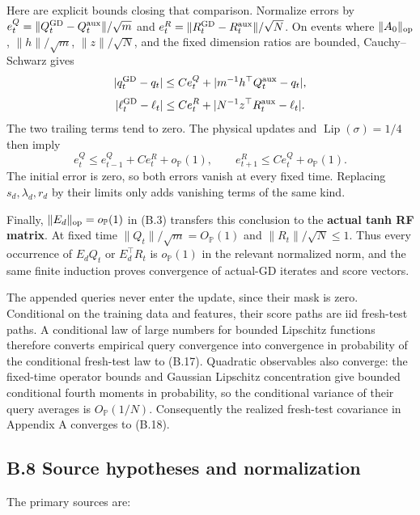 \documentclass[
  11pt,
  a4paper,
]{article}
\begin{document}
Here are explicit bounds closing that comparison. Normalize errors by
\(e^Q_t=\|Q_t^{\rm GD}-Q_t^{\rm aux}\|/\sqrt m\) and
\(e^R_t=\|R_t^{\rm GD}-R_t^{\rm aux}\|/\sqrt N\). On events where
\(\|A_0\|_{\rm op}\), \(\|h\|/\sqrt m\), \(\|z\|/\sqrt N\), and the
fixed dimension ratios are bounded, Cauchy--Schwarz gives \[
|q_t^{\rm GD}-q_t|\le C e^Q_t+
|m^{-1}h^\top Q_t^{\rm aux}-q_t|,
\] \[
|\ell_t^{\rm GD}-\ell_t|\le C e^R_t+
|N^{-1}z^\top R_t^{\rm aux}-\ell_t|.
\] The two trailing terms tend to zero. The physical updates and
\(\operatorname{Lip}(\sigma)=1/4\) then imply \[
e^Q_t\le e^Q_{t-1}+C e^R_t+o_{\mathbb P}(1),\qquad
e^R_{t+1}\le C e^Q_t+o_{\mathbb P}(1).
\tag{B.20}
\] The initial error is zero, so both errors vanish at every fixed time.
Replacing \(s_d,\lambda_d,r_d\) by their limits only adds vanishing
terms of the same kind.

Finally, \(\|E_d\|_{\rm op}=o_{\mathbb P}(1)\) in (B.3) transfers this
conclusion to the \textbf{actual tanh RF matrix}. At fixed time
\(\|Q_t\|/\sqrt m=O_{\mathbb P}(1)\) and \(\|R_t\|/\sqrt N\le1\). Thus
every occurrence of \(E_dQ_t\) or \(E_d^\top R_t\) is
\(o_{\mathbb P}(1)\) in the relevant normalized norm, and the same
finite induction proves convergence of actual-GD iterates and score
vectors.

The appended queries never enter the update, since their mask is zero.
Conditional on the training data and features, their score paths are iid
fresh-test paths. A conditional law of large numbers for bounded
Lipschitz functions therefore converts empirical query convergence into
convergence in probability of the conditional fresh-test law to (B.17).
Quadratic observables also converge: the fixed-time operator bounds and
Gaussian Lipschitz concentration give bounded conditional fourth moments
in probability, so the conditional variance of their query averages is
\(O_{\mathbb P}(1/N)\). Consequently the realized fresh-test covariance
in Appendix A converges to (B.18).

\hypertarget{b.8-source-hypotheses-and-normalization}{%
\subsection{B.8 Source hypotheses and
normalization}\label{b.8-source-hypotheses-and-normalization}}

The primary sources are:
\end{document}
